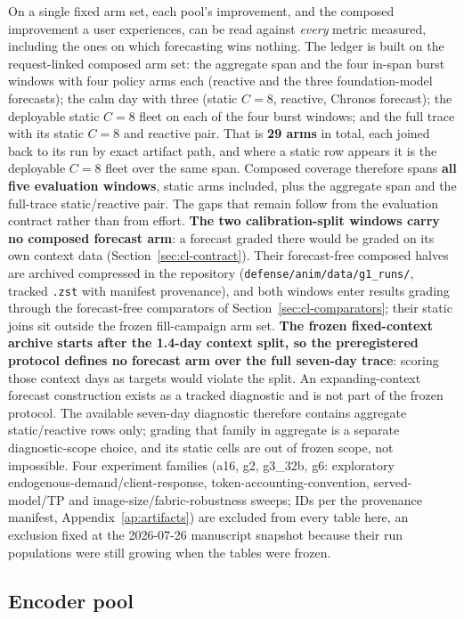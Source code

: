 On a single fixed arm set, each pool's improvement, and the composed
improvement a user experiences, can be read
against \emph{every} metric measured, including the ones on which forecasting
wins nothing. The ledger is built on the request-linked composed arm set: the
aggregate span and the four in-span burst windows with four policy arms each
(reactive and the three foundation-model forecasts); the calm day with three
(static $C{=}8$, reactive, Chronos forecast); the deployable static $C{=}8$
fleet on each of the four burst windows; and the full trace with its static
$C{=}8$ and reactive pair. That is \textbf{29 arms} in total, each joined back to
its run by exact artifact path, and where a static row appears it is the
deployable $C{=}8$ fleet over the same span. Composed coverage therefore spans
\textbf{all five evaluation windows}, static arms included, plus the aggregate
span and the full-trace static/reactive pair. The gaps that remain follow
from the evaluation contract rather than from effort. \textbf{The two
calibration-split windows carry no composed forecast arm}: a forecast graded
there would be graded on its own context data
(Section~\ref{sec:cl-contract}). Their
forecast-free composed halves are archived compressed in
the repository (\texttt{defense/anim/data/g1\_runs/}, tracked
\texttt{.zst} with manifest provenance), and both
windows enter results grading through the forecast-free comparators of
Section~\ref{sec:cl-comparators}; their static joins sit outside the
frozen fill-campaign arm set. \textbf{The frozen fixed-context archive starts after the 1.4-day
context split, so the preregistered protocol defines no forecast arm over
the full seven-day trace}: scoring those context days as targets would
violate the split. An expanding-context forecast construction exists as a
tracked diagnostic and is not part of the frozen protocol. The available
seven-day diagnostic therefore contains aggregate static/reactive rows
only; grading that family in aggregate is a separate diagnostic-scope
choice, and its static cells are out of frozen scope, not impossible.
Four experiment families (a16, g2, g3\_32b, g6: exploratory
endogenous-demand/client-response, token-accounting-convention,
served-model/TP and image-size/fabric-robustness sweeps; IDs per the
provenance manifest,
Appendix~\ref{ap:artifacts}) are excluded from every table
here, an exclusion fixed at the 2026-07-26 manuscript snapshot because their
run populations were still growing when the tables were frozen.

\subsection{Encoder pool}
\label{sec:cl-ledger-enc}

